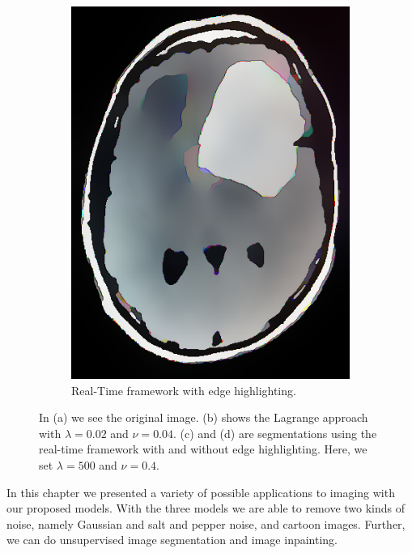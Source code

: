 \documentclass[abstracton]{scrreprt}
\begin{document}
\begin{figure}[!ht]
\begin{subfigure}[b]{0.24\textwidth}
                    \includegraphics[width=\textwidth]{img/segmentation/rt/keating_eh.png}
                    \caption{Real-Time framework with edge highlighting.}
                \end{subfigure}
                \caption[Image segmentation for a brain tumor image.]{In (a) we see the original image. (b) shows the Lagrange approach with $\lambda = 0.02$ and $\nu = 0.04$. (c) and (d) are segmentations using the real-time framework with and without edge highlighting. Here, we set $\lambda = 500$ and $\nu = 0.4$.}
            \label{fig:segmentation_evolution_keating}
            \end{figure}

    In this chapter we presented a variety of possible applications to imaging with our proposed models. With the three models we are able to remove two kinds of noise, namely Gaussian and salt and pepper noise, and cartoon images. Further, we can do unsupervised image segmentation and image inpainting.
\end{document}
